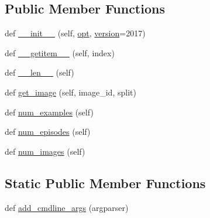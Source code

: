 \subsection*{Public Member Functions}
\begin{DoxyCompactItemize}
\item 
def \hyperlink{classparlai_1_1tasks_1_1coco__caption_1_1agents_1_1DefaultDataset_a2abc452a6af8c79ba5894a23803517e4}{\+\_\+\+\_\+init\+\_\+\+\_\+} (self, \hyperlink{classparlai_1_1tasks_1_1coco__caption_1_1agents_1_1DefaultDataset_adaa89b61b63ef4c1291774fda7abaf3c}{opt}, \hyperlink{classparlai_1_1tasks_1_1coco__caption_1_1agents_1_1DefaultDataset_a3f8225c248c5b7f8ccf67aeae46321fc}{version}=\textquotesingle{}2017\textquotesingle{})
\item 
def \hyperlink{classparlai_1_1tasks_1_1coco__caption_1_1agents_1_1DefaultDataset_ab8de4a6469a2952710a6921ce19a88f6}{\+\_\+\+\_\+getitem\+\_\+\+\_\+} (self, index)
\item 
def \hyperlink{classparlai_1_1tasks_1_1coco__caption_1_1agents_1_1DefaultDataset_a23416fba34b1d20a547b7beef3efd220}{\+\_\+\+\_\+len\+\_\+\+\_\+} (self)
\item 
def \hyperlink{classparlai_1_1tasks_1_1coco__caption_1_1agents_1_1DefaultDataset_ae769cbe2c9a42fc0ecc817a2baeffb77}{get\+\_\+image} (self, image\+\_\+id, split)
\item 
def \hyperlink{classparlai_1_1tasks_1_1coco__caption_1_1agents_1_1DefaultDataset_aec6fa2ed48a0ef6af6d2088fc2506623}{num\+\_\+examples} (self)
\item 
def \hyperlink{classparlai_1_1tasks_1_1coco__caption_1_1agents_1_1DefaultDataset_a436d5bfe6f79ae3d94f1935e56bf4f84}{num\+\_\+episodes} (self)
\item 
def \hyperlink{classparlai_1_1tasks_1_1coco__caption_1_1agents_1_1DefaultDataset_a72b989d5f9bf33fb573c89d9645e16ea}{num\+\_\+images} (self)
\end{DoxyCompactItemize}
\subsection*{Static Public Member Functions}
\begin{DoxyCompactItemize}
\item 
def \hyperlink{classparlai_1_1tasks_1_1coco__caption_1_1agents_1_1DefaultDataset_aa5f5534adc8bd5fe08a8022653ac71ca}{add\+\_\+cmdline\+\_\+args} (argparser)
\end{DoxyCompactItemize}

